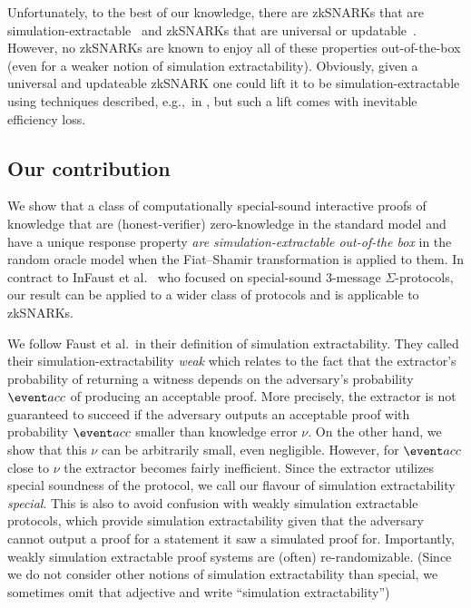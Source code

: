 \documentclass[runningheads,11pt]{llncs}
\begin{document}
Unfortunately, to the best of our knowledge, there are zkSNARKs that are
simulation-extractable~\cite{C:GroMal17,EPRINT:BowGab18,EPRINT:AtaBag19,EC:Groth16}
and zkSNARKs that are universal or
updatable~\cite{C:GKMMM18,CCS:MBKM19,EPRINT:GabWilCio19,EC:CHMMVW20}. However, no zkSNARKs are known to enjoy all of these properties out-of-the-box
(even for a weaker notion of simulation extractability). Obviously, given a
universal and updateable zkSNARK one could lift it to be simulation-extractable using
techniques described, e.g.,~in \cite{EPRINT:KZMQCP15,CCS:AbdRamSla20}, but such a
lift comes with inevitable efficiency loss.  %

\subsection{Our contribution}
We show that a class of computationally special-sound interactive proofs of
knowledge that are (honest-verifier) zero-knowledge in the standard model and
have a unique response property \emph{are simulation-extractable out-of-the box}
in the random oracle model when the Fiat--Shamir transformation is applied to
them. In contract to InFaust et al.~\cite{INDOCRYPT:FKMV12} who focused on
special-sound $3$-message $\Sigma$-protocols, our result can be applied to a
wider class of protocols and is applicable to zkSNARKs.

We follow Faust et al.~in their definition of simulation extractability. They
called their simulation-extractability \emph{weak} which relates to the fact
that the extractor's probability of returning a witness depends on the
adversary's probability $\accProb$ of producing an acceptable proof. More
precisely, the extractor is not guaranteed to succeed if the adversary outputs
an acceptable proof with probability $\accProb$ smaller than knowledge error
$\nu$. On the other hand, we show that this $\nu$ can be arbitrarily small, even
negligible. However, for $\accProb$ close to $\nu$ the extractor becomes fairly
inefficient. Since the extractor utilizes special soundness of the protocol, we
call our flavour of simulation extractability \emph{special}. This is also to
avoid confusion with weakly simulation extractable protocols, which provide
simulation extractability given that the adversary cannot output a proof for a
statement it saw a simulated proof for. Importantly, weakly simulation
extractable proof systems are (often) re-randomizable. (Since we do not consider other notions
of simulation extractability than special, we sometimes omit that adjective and
write ``simulation extractability'')
\end{document}
